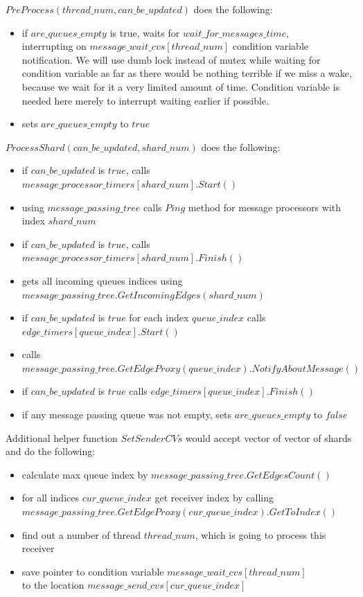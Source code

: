 \documentclass{article}
\begin{document}
$PreProcess(thread\_num, can\_be\_updated)$ does the following:
\begin{itemize}
	\item if $are\_queues\_empty$ is true, waits for $wait\_for\_messages\_time$,\\
		interrupting on $message\_wait\_cvs[thread\_num]$ condition variable notification. We will use dumb lock instead of mutex while waiting for condition variable as far as there would be nothing terrible if we miss a wake, because we wait for it a very limited amount of time. Condition variable is needed here merely to interrupt waiting earlier if possible.
	\item sets $are\_queues\_empty$ to $true$
\end{itemize}

$ProcessShard(can\_be\_updated, shard\_num)$ does the following:
\nopagebreak
\begin{itemize}
	\item if $can\_be\_updated$ is $true$, calls $message\_processor\_timers[shard\_num].Start()$
	\item using $message\_passing\_tree$ calls $Ping$ method for message processors with index $shard\_num$
	\item if $can\_be\_updated$ is $true$, calls $message\_processor\_timers[shard\_num].Finish()$
	\item gets all incoming queues indices using \\
		$message\_passing\_tree.GetIncomingEdges(shard\_num)$
	\item if $can\_be\_updated$ is $true$ for each index $queue\_index$ calls \\
		$edge\_timers[queue\_index].Start()$
	\item calls $message\_passing\_tree.GetEdgeProxy(queue\_index).NotifyAboutMessage()$
	\item if $can\_be\_updated$ is $true$ calls $edge\_timers[queue\_index].Finish()$
	\item if any message passing queue was not empty, sets $are\_queues\_empty$ to $false$
\end{itemize}

Additional helper function $SetSenderCVs$ would accept vector of vector of shards and do the following:
\begin{itemize}
	\item calculate max queue index by $message\_passing\_tree.GetEdgesCount()$
	\item for all indices $cur\_queue\_index$ get receiver index by calling\\
		$message\_passing\_tree.GetEdgeProxy(cur\_queue\_index).GetToIndex()$
	\item find out a number of thread $thread\_num$, which is going to process this receiver
	\item save pointer to condition variable $message\_wait\_cvs[thread\_num]$ \\ to the location $message\_send\_cvs[cur\_queue\_index]$
\end{itemize}
\end{document}
